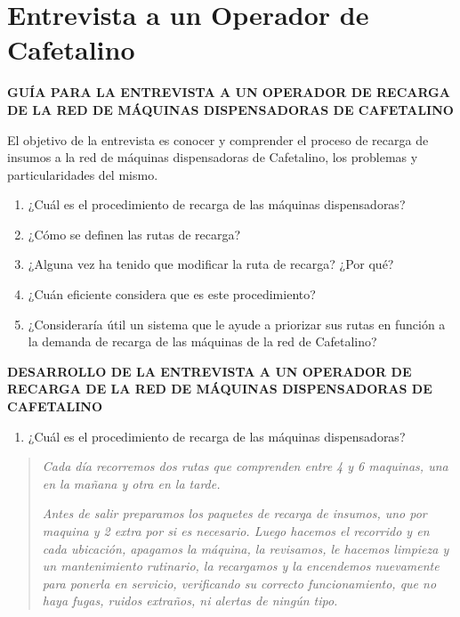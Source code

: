 \section{Entrevista a un Operador de Cafetalino}\label{anexo-entrevista-a-un-operador-de-cafetalino}

\textbf{GUÍA PARA LA ENTREVISTA A UN OPERADOR DE RECARGA DE LA RED DE MÁQUINAS DISPENSADORAS DE CAFETALINO}

El objetivo de la entrevista es conocer y comprender el proceso de recarga de insumos a la red de máquinas dispensadoras de Cafetalino, los problemas y particularidades del mismo.

\begin{enumerate}
\def\labelenumi{\arabic{enumi}.}
\item
  ¿Cuál es el procedimiento de recarga de las máquinas dispensadoras?
\item
  ¿Cómo se definen las rutas de recarga?
\item
  ¿Alguna vez ha tenido que modificar la ruta de recarga? ¿Por qué?
\item
  ¿Cuán eficiente considera que es este procedimiento?
\item
  ¿Consideraría útil un sistema que le ayude a priorizar sus rutas en función a la demanda de recarga de las máquinas de la red de Cafetalino?
\end{enumerate}

\textbf{DESARROLLO DE LA ENTREVISTA A UN OPERADOR DE RECARGA DE LA RED DE MÁQUINAS DISPENSADORAS DE CAFETALINO}

\begin{enumerate}
\def\labelenumi{\arabic{enumi}.}
\item
  ¿Cuál es el procedimiento de recarga de las máquinas dispensadoras?
\end{enumerate}

\begin{quote}
\emph{Cada día recorremos dos rutas que comprenden entre 4 y 6 maquinas, una en la mañana y otra en la tarde.}

\emph{Antes de salir preparamos los paquetes de recarga de insumos, uno por maquina y 2 extra por si es necesario. Luego hacemos el recorrido y en cada ubicación, apagamos la máquina, la revisamos, le hacemos limpieza y un mantenimiento rutinario, la recargamos y la encendemos nuevamente para ponerla en servicio, verificando su correcto funcionamiento, que no haya fugas, ruidos extraños, ni alertas de ningún tipo.}
\end{quote}

